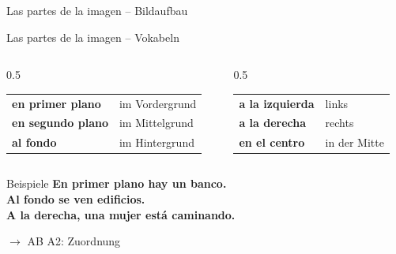 \documentclass[aspectratio=169, 14pt]{beamer}
\newcommand{\es}[1]{\textbf{#1}}
\newcommand{\de}[1]{\textit{\textcolor{gray}{#1}}}
\newcommand{\abmark}[1]{\textcolor{spanisch}{$\rightarrow$ AB #1}}
\begin{document}
\begin{frame}{Las partes de la imagen – Bildaufbau}

\begin{center}
\end{center}

\end{frame}

\begin{frame}{Las partes de la imagen – Vokabeln}

\begin{columns}
\begin{column}{0.5\textwidth}
\begin{tabular}{ll}
\es{en primer plano} & im Vordergrund \\[0.5em]
\es{en segundo plano} & im Mittelgrund \\[0.5em]
\es{al fondo} & im Hintergrund \\[0.5em]
\end{tabular}
\end{column}

\begin{column}{0.5\textwidth}
\begin{tabular}{ll}
\es{a la izquierda} & links \\[0.5em]
\es{a la derecha} & rechts \\[0.5em]
\es{en el centro} & in der Mitte \\[0.5em]
\end{tabular}
\end{column}
\end{columns}

\vspace{1.5em}

\begin{exampleblock}{Beispiele}
\es{En primer plano hay un banco.}\\
\es{Al fondo se ven edificios.}\\
\es{A la derecha, una mujer está caminando.}
\end{exampleblock}

\abmark{A2: Zuordnung}

\end{frame}
\end{document}
